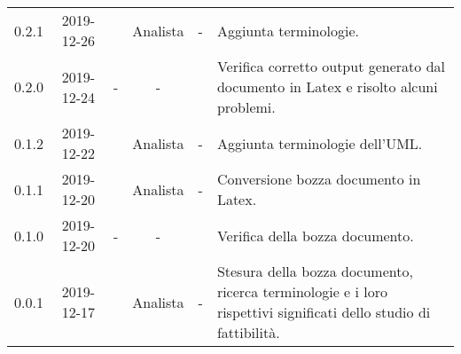 {\begin{longtable}{ c c  C{2.5cm} c c C{3.5cm}}
0.2.1 & 2019-12-26 & \MC{} & Analista & - & Aggiunta terminologie. \\

0.2.0 & 2019-12-24 & - & - & \DF{} & Verifica corretto output generato dal documento in Latex e risolto alcuni problemi. \\

0.1.2 & 2019-12-22 & \CE{} & Analista & - & Aggiunta terminologie dell'UML. \\

0.1.1 & 2019-12-20 & \MC{} & Analista & - & Conversione bozza documento in Latex. \\
		
0.1.0 & 2019-12-20 & - & - & \DF{} & Verifica della bozza documento. \\
		
0.0.1 & 2019-12-17 & \MC{} & Analista & - & Stesura della bozza documento, ricerca terminologie e i loro rispettivi significati dello studio di fattibilità. \\
		
\end{longtable}
}